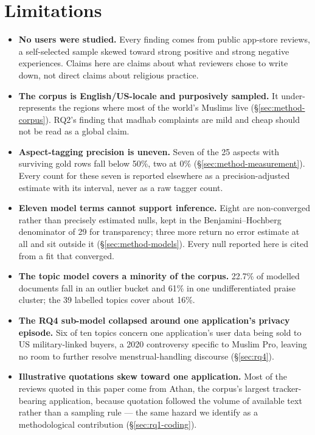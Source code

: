 
\section{Limitations}
\label{sec:limitations}

\begin{itemize}

\item \textbf{No users were studied.} Every finding comes from public
app-store reviews, a self-selected sample skewed toward strong positive and
strong negative experiences. Claims here are claims about what reviewers
chose to write down, not direct claims about religious practice.

\item \textbf{The corpus is English/US-locale and purposively sampled.} It
under-represents the regions where most of the world's Muslims live
(\S\ref{sec:method-corpus}). RQ2's finding that madhab complaints are mild and
cheap should not be read as a global claim.

\item \textbf{Aspect-tagging precision is uneven.} Seven of the 25 aspects with
surviving gold rows fall below 50\%, two at 0\%
(\S\ref{sec:method-measurement}). Every count for these seven is reported
elsewhere as a precision-adjusted estimate with its interval, never as a raw
tagger count.

\item \textbf{Eleven model terms cannot support inference.} Eight are
non-converged rather than precisely estimated nulls, kept in the
Benjamini--Hochberg denominator of 29 for transparency; three more return no
error estimate at all and sit outside it (\S\ref{sec:method-models}). Every
null reported here is cited from a fit that converged.

\item \textbf{The topic model covers a minority of the corpus.} 22.7\% of
modelled documents fall in an outlier bucket and 61\% in one undifferentiated
praise cluster; the 39 labelled topics cover about 16\%.

\item \textbf{The RQ4 sub-model collapsed around one application's privacy
episode.} Six of ten topics concern one application's user data being sold to
US military-linked buyers, a 2020 controversy specific to Muslim Pro, leaving
no room to further resolve menstrual-handling discourse (\S\ref{sec:rq4}).

\item \textbf{Illustrative quotations skew toward one application.} Most of
the reviews quoted in this paper come from Athan, the corpus's largest
tracker-bearing application, because quotation followed the volume of
available text rather than a sampling rule --- the same hazard we identify as
a methodological contribution (\S\ref{sec:rq1-coding}).


\end{itemize}
